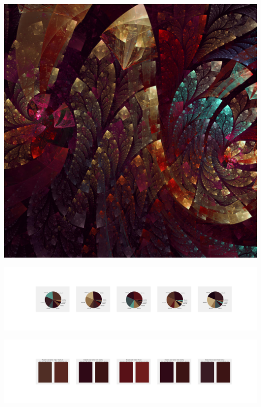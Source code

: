 \documentclass[11pt]{article}
\begin{document}
\begin{landscape}
    \begin{center}
    \includegraphics[width=\textwidth]{./nbimg/file (194).jpg}
    \end{center}

    \begin{center}
    \includegraphics[width=250mm]{./nbimg/pie-105.jpg}
    \end{center}

    \begin{center}
    \includegraphics[width=250mm]{./nbimg/peak-105.jpg}
    \end{center}
    


\end{landscape}
\end{document}
